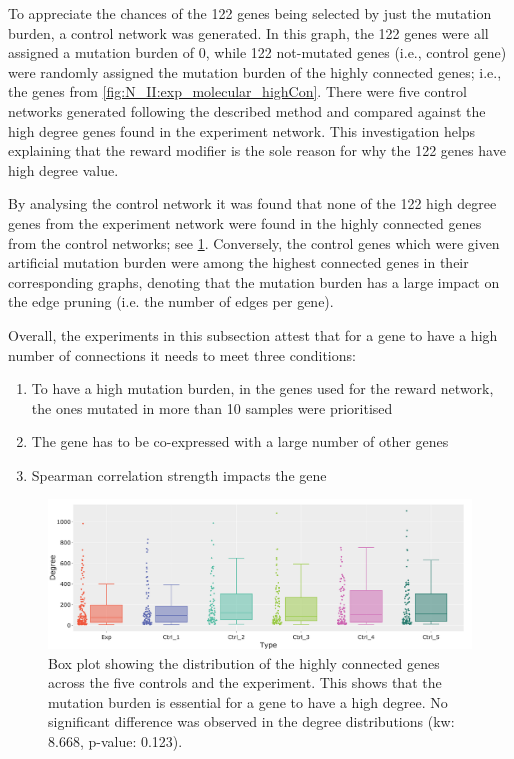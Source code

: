 To appreciate the chances of the 122 genes being selected by just the mutation burden, a control network was generated. In this graph, the 122 genes were all assigned a mutation burden of 0, while 122 not-mutated genes (i.e., control gene) were randomly assigned the mutation burden of the highly connected genes; i.e., the genes from \cref{fig:N_II:exp_molecular_highCon}. There were five control networks generated following the described method and compared against the high degree genes found in the experiment network. This investigation helps explaining that the reward modifier is the sole reason for why the 122 genes have high degree value. 


By analysing the control network it was found that none of the 122 high degree genes from the experiment network were found in the highly connected genes from the control networks; see \cref{fig:N_II:ctrl_box}. Conversely, the control genes which were given artificial mutation burden were among the highest connected genes in their corresponding graphs, denoting that the mutation burden has a large impact on the edge pruning (i.e. the number of edges per gene). 

Overall, the experiments in this subsection attest that for a gene to have a high number of connections it needs to meet three conditions:
\begin{enumerate}
    \item To have a high mutation burden, in the genes used for the reward network, the ones mutated in more than 10 samples were prioritised
    \item The gene has to be co-expressed with a large number of other genes
    \item Spearman correlation strength impacts the gene
\end{enumerate}

\begin{figure}[!htb]    
    \centering
    \includegraphics[width=1.0\textwidth,height=1.0\textheight,keepaspectratio]{Sections/Network_II/resources/reward/ctr_degree.png}
   \caption[The degree of highly connected genes across control networks]{Box plot showing the distribution of the highly connected genes across the five controls and the experiment. This shows that the mutation burden is essential for a gene to have a high degree. No significant difference was observed in the degree distributions (\acrshort{kw}: 8.668, p-value: 0.123).}
    \label{fig:N_II:ctrl_box}
\end{figure}


